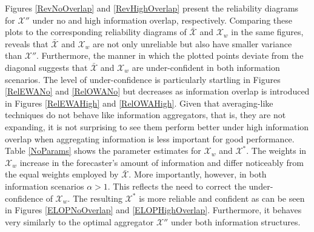 \documentclass[12pt]{article}
\theoremstyle{definition}
\theoremstyle{definition}
\begin{document}
Figures \ref{RevNoOverlap} and \ref{RevHighOverlap} present the reliability diagrams for $\mathcal{X}''$ under no and high information overlap, respectively. Comparing these plots to the corresponding reliability diagrams of $\bar{\mathcal{X}}$ and $\mathcal{X}_w$ in the same figures, reveals that $\bar{\mathcal{X}}$ and $\mathcal{X}_w$ are not only unreliable but also have smaller variance than $\mathcal{X}''$. Furthermore, the manner in which the plotted points deviate from the diagonal suggests that $\bar{\mathcal{X}}$ and $\mathcal{X}_w$ are under-confident in both information scenarios.  The level of under-confidence 
is particularly startling in Figures \ref{RelEWANo} and \ref{RelOWANo} but 
decreases as information overlap is introduced in Figures \ref{RelEWAHigh} and \ref{RelOWAHigh}.  
  Given that averaging-like techniques do not behave like information aggregators, that is, they are not expanding, it is not surprising to see them perform better under high information overlap when aggregating information is less important for good performance. Table \ref{NoParams} shows the parameter estimates for $\mathcal{X}_w$ and $\mathcal{X}^*$.  The weights in $\mathcal{X}_w$ increase in the forecaster's amount of information and differ noticeably from the equal weights employed by $\bar{\mathcal{X}}$. 
More importantly, however, in both information scenarios $\alpha > 1$. This reflects the need to correct the under-confidence of $\mathcal{X}_w$. The resulting $\mathcal{X}^*$ is more reliable and confident as can be seen in Figures \ref{ELOPNoOverlap} and \ref{ELOPHighOverlap}. Furthermore, it behaves very similarly to the optimal aggregator $\mathcal{X}''$ under both information structures. 



\end{document}

